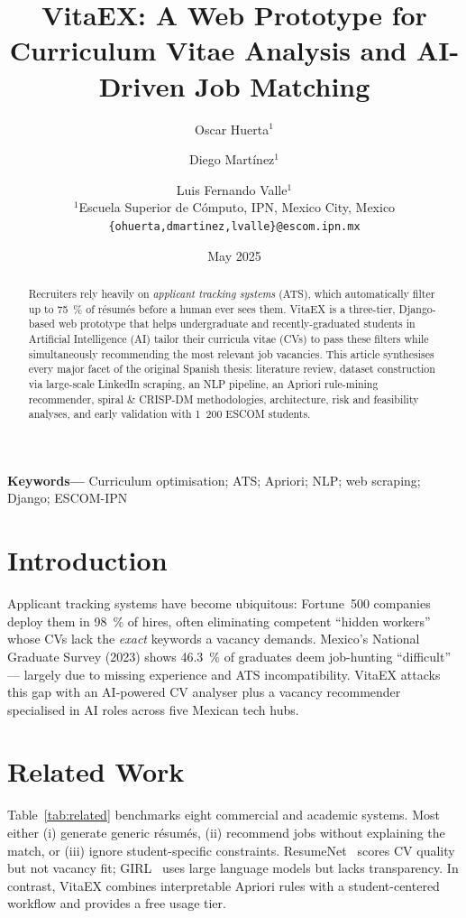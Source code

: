 \documentclass[12pt,a4paper]{article}
\title{VitaEX: A Web Prototype for Curriculum Vitae Analysis and AI-Driven Job Matching}
\author{Oscar Huerta$^1$ \and Diego Martínez$^1$ \and Luis Fernando Valle$^1$ \\ $^1$Escuela Superior de Cómputo, IPN, Mexico City, Mexico \\ \texttt{\{ohuerta,dmartinez,lvalle\}@escom.ipn.mx}}
\date{May 2025}
\begin{document}
	\maketitle
	
	\begin{abstract}
		Recruiters rely heavily on \emph{applicant tracking systems} (ATS), which automatically filter up to 75~\% of résumés before a human ever sees them. VitaEX is a three-tier, Django-based web prototype that helps undergraduate and recently-graduated students in Artificial Intelligence (AI) tailor their curricula vitae (CVs) to pass these filters while simultaneously recommending the most relevant job vacancies. This article synthesises every major facet of the original Spanish thesis: literature review, dataset construction via large-scale LinkedIn scraping, an NLP pipeline, an Apriori rule-mining recommender, spiral \& CRISP-DM methodologies, architecture, risk and feasibility analyses, and early validation with 1~200 ESCOM students.
	\end{abstract}
	
	\textbf{Keywords—} Curriculum optimisation; ATS; Apriori; NLP; web scraping; Django; ESCOM-IPN
	
	\section{Introduction}
	Applicant tracking systems have become ubiquitous: Fortune~500 companies deploy them in 98~\% of hires, often eliminating competent “hidden workers” whose CVs lack the \emph{exact} keywords a vacancy demands. Mexico’s National Graduate Survey (2023) shows 46.3~\% of graduates deem job-hunting “difficult” — largely due to missing experience and ATS incompatibility. VitaEX attacks this gap with an AI-powered CV analyser plus a vacancy recommender specialised in AI roles across five Mexican tech hubs.
	
	\section{Related Work}
	Table~\ref{tab:related} benchmarks eight commercial and academic systems. Most either (i) generate generic résumés, (ii) recommend jobs without explaining the match, or (iii) ignore student-specific constraints. ResumeNet~\cite{resumenet} scores CV quality but not vacancy fit; GIRL~\cite{girl} uses large language models but lacks transparency. In contrast, VitaEX combines interpretable Apriori rules with a student-centered workflow and provides a free usage tier.
	
\end{document}

